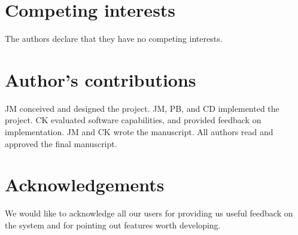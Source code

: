 \documentclass{bmcart}
\begin{document}

\begin{backmatter}

\section*{Competing interests}
The authors declare that they have no competing interests.

\section*{Author's contributions}
JM conceived and designed the project. JM, PB, and CD implemented the project. CK evaluated software capabilities, and provided 
feedback on implementation. JM and CK wrote the manuscript. All authors read and approved the final manuscript.

\section*{Acknowledgements}
We would like to acknowledge all our users for providing us useful feedback on
the system and for pointing out features worth developing.




\end{backmatter}
\end{document}
